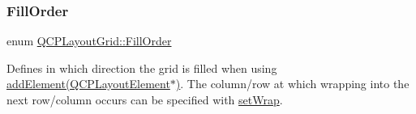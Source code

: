 \subsubsection{\texorpdfstring{Fill\+Order}{FillOrder}\hspace{0.1cm}{\footnotesize\ttfamily [1/2]}}
{\footnotesize\ttfamily enum \hyperlink{class_q_c_p_layout_grid_a7d49ee08773de6b2fd246edfed353cca}{Q\+C\+P\+Layout\+Grid\+::\+Fill\+Order}}

Defines in which direction the grid is filled when using \hyperlink{class_q_c_p_layout_grid_a4c44025dd25acd27e053cadfd448ad7b}{add\+Element(\+Q\+C\+P\+Layout\+Element$\ast$)}. The column/row at which wrapping into the next row/column occurs can be specified with \hyperlink{class_q_c_p_layout_grid_ab36af18d77e4428386d02970382ee598}{set\+Wrap}.

